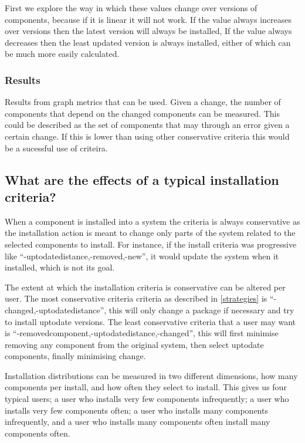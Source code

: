 First we explore the way in which these values change over versions of components, because if it is linear it will not work.
If the value always increases over versions then the latest version will always be installed,
If the value always decreases then the least updated version is always installed, either of which can be much more easily calculated.

\subsubsection{Results}
Results from graph metrics that can be used.
Given a change, the number of components that depend on the changed components can be measured.
This could be described as the set of components that may through an error given a certain change.
If this is lower than using other conservative criteria this would be a sucessful use of criteira.

\subsection{What are the effects of a typical installation criteria?}
When a component is installed into a system the criteria is always conservative as the installation action is meant to change only parts of the system related to the selected components to install.
For instance, if the install criteria was progressive like ``-uptodatedistance,-removed,-new'', it would update the system when it installed, which is not its goal.

The extent at which the installation criteria is conservative can be altered per user.
The most conservative criteria criteria as described in \ref{strategies}  is ``-changed,-uptodatedistance'', this will only change a package if necessary and try to install uptodate versions.
The least conservative criteria that a user may want is ``-removedcomponent,-uptodatedistance,-changed'', this will first minimise removing any component from the original system,
then select uptodate components, finally minimising change.

Installation distributions can be measured in two different dimensions, how many components per install, and how often they select to install.
This gives us four typical users; a user who installs very few components infrequently; 
a user who installs very few components often;
a user who installs many components infrequently,
and a user who installs many components often install many components often.

